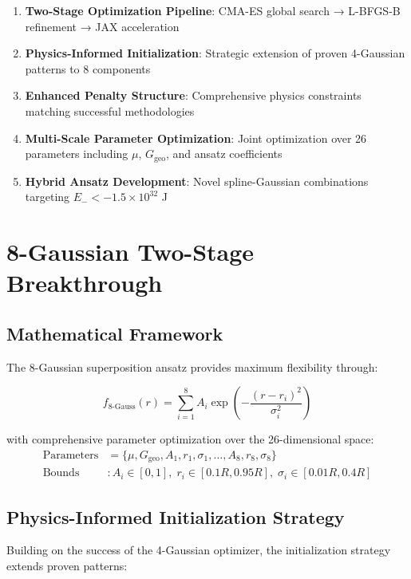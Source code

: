 \documentclass[11pt,a4paper]{article}
\begin{document}
\begin{enumerate}
\item \textbf{Two-Stage Optimization Pipeline}: CMA-ES global search → L-BFGS-B refinement → JAX acceleration
\item \textbf{Physics-Informed Initialization}: Strategic extension of proven 4-Gaussian patterns to 8 components
\item \textbf{Enhanced Penalty Structure}: Comprehensive physics constraints matching successful methodologies
\item \textbf{Multi-Scale Parameter Optimization}: Joint optimization over 26 parameters including $\mu$, $G_{\text{geo}}$, and ansatz coefficients
\item \textbf{Hybrid Ansatz Development}: Novel spline-Gaussian combinations targeting $E_- < -1.5 \times 10^{32}$ J
\end{enumerate}

\section{8-Gaussian Two-Stage Breakthrough}

\subsection{Mathematical Framework}

The 8-Gaussian superposition ansatz provides maximum flexibility through:

\begin{equation}
f_{8\text{-Gauss}}(r) = \sum_{i=1}^{8} A_i \exp\left(-\frac{(r - r_i)^2}{\sigma_i^2}\right)
\end{equation}

with comprehensive parameter optimization over the 26-dimensional space:
\begin{align}
\text{Parameters} &= \{\mu, G_{\text{geo}}, A_1, r_1, \sigma_1, \ldots, A_8, r_8, \sigma_8\} \\
\text{Bounds} &: A_i \in [0,1], \; r_i \in [0.1R, 0.95R], \; \sigma_i \in [0.01R, 0.4R]
\end{align}

\subsection{Physics-Informed Initialization Strategy}

Building on the success of the 4-Gaussian optimizer, the initialization strategy extends proven patterns:
\end{document}
